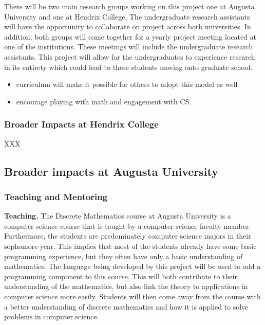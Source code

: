 There will be two main research groups working on this project one at
Augusta University and one at Hendrix College.  The undergraduate
research assistants will have the opportunity to collaborate on
project across both universities.  In addition, both groups will come
together for a yearly project meeting located at one of the
institutions.  These meetings will include the undergraduate research
assistants.  This project will allow for the undergraduates to
experience research in its entirety which could lead to these students
moving onto graduate school.

\begin{itemize}
\item curriculum will make it possible for others to adopt this model
  as well
\item encourage playing with math and engagement with CS.
\end{itemize}

\subsubsection{Broader Impacts at Hendrix College}
\label{subsec:broader_impacts_at_hendrix_college}
XXX

\subsection{Broader impacts at Augusta University}
\label{subsec:broader_impacts_at_augusta_university}

\subsubsection{Teaching and Mentoring}
\label{subsec:teaching_and_mentoring}

\textbf{Teaching.}  The Discrete Mathematics course at Augusta
University is a computer science course that is taught by a computer
science faculty member.  Furthermore, the students are predominately
computer science majors in their sophomore year.  This implies that
most of the students already have some basic programming experience,
but they often have only a basic understanding of mathematics.  The
language being developed by this project will be used to add a
programming component to this course.  This will both contribute to
their understanding of the mathematics, but also link the theory to
applications in computer science more easily.  Students will then come
away from the course with a better understanding of discrete
mathematics and how it is applied to solve problems in computer
science.

